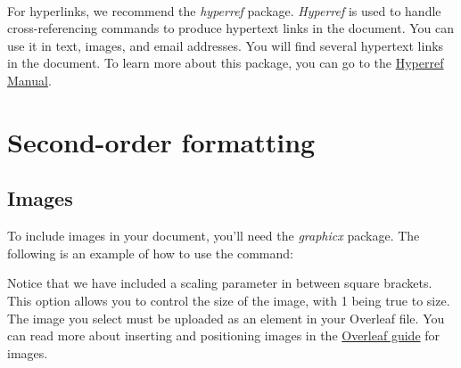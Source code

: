 \documentclass{article} %
\begin{document}
\paragraph{}
For hyperlinks, we recommend the \textit{hyperref} package. \textit{Hyperref} is used to handle cross-referencing commands to produce hypertext links in the document. You can use it in text, images, and email addresses. You will find several hypertext links in the document. To learn more about this package, you can go to the \href{https://mirrors.mit.edu/CTAN/macros/latex/contrib/hyperref/doc/hyperref-doc.pdf}{Hyperref Manual}. 

\section{Second-order formatting}
\subsection{Images}
To include images in your document, you'll need the \textit{graphicx} package. The following is an example of how to use the command: 

\begin{center}
    \color{Green}{\verb+\includegraphics+}\color{black}{[scale=1.5]}\color{Green}{\verb+{+}\color{black}{myimage.png}\color{Green}{\verb+}+}
\end{center}

Notice that we have included a scaling parameter in between square brackets. This option allows you to control the size of the image, with 1 being true to size. The image you select must be uploaded as an element in your Overleaf file. You can read more about inserting and positioning images in the \href{https://www.overleaf.com/learn/latex/Inserting_Images}{Overleaf guide} for images.
\end{document}
